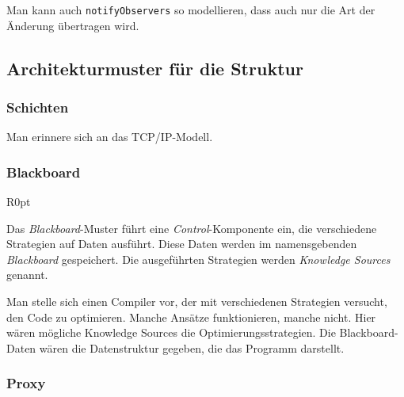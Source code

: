 \documentclass[german]{panikzettel}
\begin{document}
Man kann auch \lstinline{notifyObservers} so modellieren, dass auch nur die Art der Änderung übertragen wird.

\subsection{Architekturmuster für die Struktur}

\subsubsection{Schichten}

Man erinnere sich an das TCP/IP-Modell.

\subsubsection{Blackboard}

\begin{wrapfigure}[15]{R}{0pt}
\end{wrapfigure}

Das \emph{Blackboard}-Muster führt eine \emph{Control}-Komponente ein, die verschiedene Strategien auf Daten ausführt.
Diese Daten werden im namensgebenden \emph{Blackboard} gespeichert.
Die ausgeführten Strategien werden \emph{Knowledge Sources} genannt.

Man stelle sich einen Compiler vor, der mit verschiedenen Strategien versucht, den Code zu optimieren.
Manche Ansätze funktionieren, manche nicht.
Hier wären mögliche Knowledge Sources die Optimierungsstrategien.
Die Blackboard-Daten wären die Datenstruktur gegeben, die das Programm darstellt.


\subsubsection{Proxy}
\end{document}
